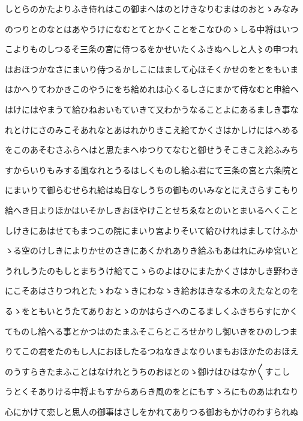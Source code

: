 \documentclass[a4paper,11pt,landscape]{ltjtarticle}
\begin{document}
しとらのかたよりふき侍れはこの御まへはのとけきなりむまはのおとゝみなみ
\par\medskip
のつりとのなとはあやうけになむとてとかくことをこなひのゝしる中将はいつ
\par\medskip
こよりものしつるそ三条の宮に侍つるをかせいたくふきぬへしと人〻の申つれ
\par\medskip
はおほつかなさにまいり侍つるかしこにはまして心ほそくかせのをとをもいま
\par\medskip
はかへりてわかきこのやうにをち給めれは心くるしさにまかて侍なむと申給へ
\par\medskip
はけにはやまうて給ひねおいもていきて又わかうなることよにあるましき事な
\par\medskip
れとけにさのみこそあれなとあはれかりきこえ給てかくさはかしけにはへめる
\par\medskip
をこのあそむさふらへはと思たまへゆつりてなむと御せうそこきこえ給ふみち
\par\medskip
すからいりもみする風なれとうるはしくものし給ふ君にて三条の宮と六条院と
\par\medskip
にまいりて御らむせられ給はぬ日なしうちの御ものいみなとにえさらすこもり
\par\medskip
給へき日よりほかはいそかしきおほやけことせちゑなとのいとまいるへくこと
\par\medskip
しけきにあはせてもまつこの院にまいり宮よりそいて給ひけれはましてけふか
\par\medskip
ゝる空のけしきによりかせのさきにあくかれありき給ふもあはれにみゆ宮いと
\par\medskip
うれしうたのもしとまちうけ給てこゝらのよはひにまたかくさはかしき野わき
\par\medskip
にこそあはさりつれとたゝわなゝきにわなゝき給おほきなる木のえたなとのを
\par\medskip
るゝをともいとうたてありおとゝのかはらさへのこるましくふきちらすにかく
\par\medskip
てものし給へる事とかつはのたまふそこらところせかりし御いきをひのしつま
\par\medskip
りてこの君をたのもし人におほしたるつねなきよなりいまもおほかたのおほえ
\par\medskip
のうすらきたまふことはなけれとうちのおほとのゝ御けはひはなか〱すこし
\par\medskip
うとくそありける中将よもすからあらき風のをとにもすゝろにものあはれなり
\par\medskip
心にかけて恋しと思人の御事はさしをかれてありつる御おもかけのわすられぬ
\par\medskip
\end{document}
